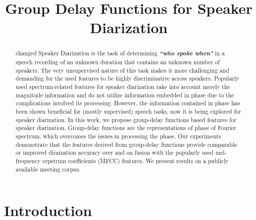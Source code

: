 \documentclass[conference]{IEEEtran}
\begin{document}
\title{Group Delay Functions for Speaker Diarization}

\author{
}

\maketitle


\begin{abstract}

changed Speaker Diarization is the task of determining {\bf\textit{``who spoke when"}} in a speech recording of an unknown duration that contains an unknown number of speakers. The very unsupervised nature of this task makes it more challenging and demanding for the used features to be highly discriminative across speakers. Popularly used spectrum-related features for speaker diarization take into account merely the magnitude information and do not utilize information embedded in phase due to the complications involved its processing. However, the information contained in phase has been shown beneficial for (mostly supervised) speech tasks, now it is being explored for speaker diarization. In this work, we propose group-delay functions based features for speaker diarization. Group-delay functions are the representations of phase of Fourier spectrum, which overcomes the issues in processing the phase. Our experiments demonstrate that the features derived from group-delay functions provide comparable or improved diraization accuracy over and on fusion with the popularly used mel-frequency cepstrum coefficients (MFCC) features. We present results on a publicly available meeting corpus. \\

\end{abstract}
\IEEEpeerreviewmaketitle



\section{Introduction}
\label{intro}
\end{document}
